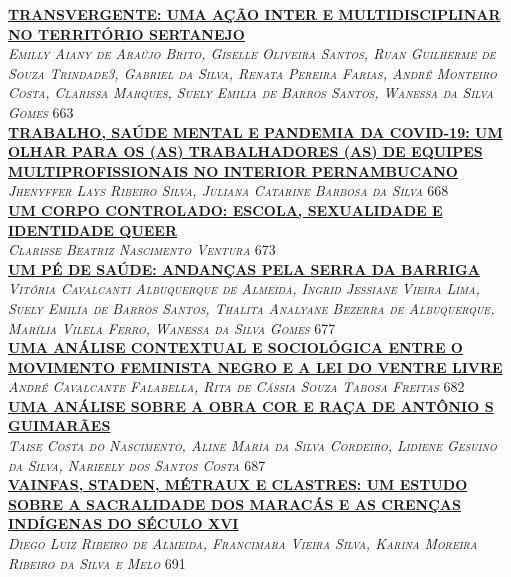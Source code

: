 \noindent \textsc{\hyperlink{trabalhos/251585.pdf.1}{\textbf{TRANSVERGENTE: UMA AÇÃO INTER E MULTIDISCIPLINAR NO TERRITÓRIO SERTANEJO}}}\\ 
\noindent \textsc{\textit{Emilly Aiany de Araújo Brito, Giselle Oliveira Santos, Ruan Guilherme de Souza Trindade3, Gabriel da Silva, Renata Pereira Farias, André Monteiro Costa, Clarissa Marques, Suely Emilia de Barros Santos, Wanessa da Silva Gomes}} \hfill 663\\ 

\noindent \textsc{\hyperlink{trabalhos/250227.pdf.1}{\textbf{TRABALHO, SAÚDE MENTAL E PANDEMIA DA COVID-19: UM OLHAR PARA OS (AS) TRABALHADORES (AS) DE EQUIPES MULTIPROFISSIONAIS NO INTERIOR PERNAMBUCANO}}}\\ 
\noindent \textsc{\textit{Jhenyffer Lays Ribeiro Silva, Juliana Catarine Barbosa da Silva}} \hfill 668\\ 

\noindent \textsc{\hyperlink{trabalhos/251584.pdf.1}{\textbf{UM CORPO CONTROLADO: ESCOLA, SEXUALIDADE E IDENTIDADE QUEER}}}\\ 
\noindent \textsc{\textit{Clarisse Beatriz Nascimento Ventura}} \hfill 673\\ 

\noindent \textsc{\hyperlink{trabalhos/251841.pdf.1}{\textbf{UM PÉ DE SAÚDE: ANDANÇAS PELA SERRA DA BARRIGA}}}\\ 
\noindent \textsc{\textit{Vitória Cavalcanti Albuquerque de Almeida, Ingrid Jessiane Vieira Lima, Suely Emilia de Barros Santos, Thalita Analyane Bezerra de Albuquerque, Marília Vilela Ferro, Wanessa da Silva Gomes}} \hfill 677\\ 

\noindent \textsc{\hyperlink{trabalhos/251714.pdf.1}{\textbf{UMA ANÁLISE CONTEXTUAL E SOCIOLÓGICA ENTRE O MOVIMENTO FEMINISTA NEGRO E A LEI DO VENTRE LIVRE}}}\\ 
\noindent \textsc{\textit{André Cavalcante Falabella, Rita de Cássia Souza Tabosa Freitas}} \hfill 682\\ 

\noindent \textsc{\hyperlink{trabalhos/251321.pdf.1}{\textbf{UMA ANÁLISE SOBRE A OBRA COR E RAÇA DE ANTÔNIO S GUIMARÃES }}}\\ 
\noindent \textsc{\textit{Taise Costa do Nascimento, Aline Maria da Silva Cordeiro, Lidiene Gesuino da Silva, Narieely dos Santos Costa}} \hfill 687\\ 

\noindent \textsc{\hyperlink{trabalhos/250085.pdf.1}{\textbf{VAINFAS, STADEN, MÉTRAUX E CLASTRES: UM ESTUDO SOBRE A SACRALIDADE DOS MARACÁS E AS CRENÇAS INDÍGENAS DO SÉCULO XVI}}}\\ 
\noindent \textsc{\textit{Diego Luiz Ribeiro de Almeida, Francimara Vieira Silva, Karina Moreira Ribeiro da Silva e Melo}} \hfill 691\\ 

